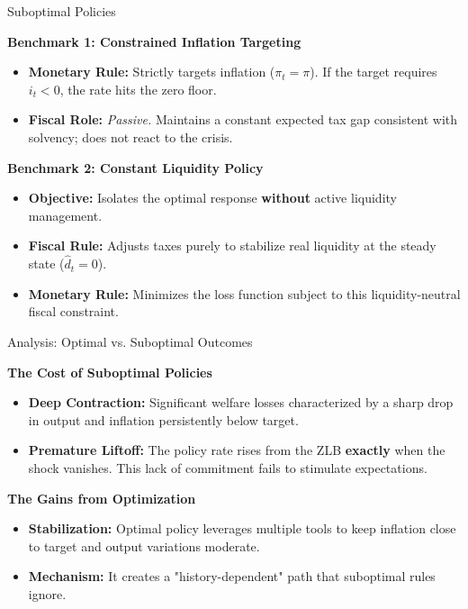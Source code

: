 \documentclass[11pt,aspectratio=169]{beamer}
\begin{document}
\begin{frame}{Suboptimal Policies}
\small

\textbf{Benchmark 1: Constrained Inflation Targeting}
\begin{itemize}
    \item \textbf{Monetary Rule:} Strictly targets inflation ($\pi _{t}=\pi$). If the target requires $i_t < 0$, the rate hits the zero floor.
    \item \textbf{Fiscal Role:} \textit{Passive.} Maintains a constant expected tax gap consistent with solvency; does not react to the crisis.
\end{itemize}

\vspace{0.4cm}

\textbf{Benchmark 2: Constant Liquidity Policy}
\begin{itemize}
    \item \textbf{Objective:} Isolates the optimal response \textbf{without} active liquidity management.
    \item \textbf{Fiscal Rule:} Adjusts taxes purely to stabilize real liquidity at the steady state ($\hat{d}_t = 0$).
    \item \textbf{Monetary Rule:} Minimizes the loss function subject to this liquidity-neutral fiscal constraint.
\end{itemize}
\end{frame}

\begin{frame}{Analysis: Optimal vs. Suboptimal Outcomes}
\small

\textbf{The Cost of Suboptimal Policies}
\begin{itemize}
    \item \textbf{Deep Contraction:} Significant welfare losses characterized by a sharp drop in output and inflation persistently below target.
    \item \textbf{Premature Liftoff:} The policy rate rises from the ZLB \textbf{exactly} when the shock vanishes. This lack of commitment fails to stimulate expectations.
\end{itemize}

\vspace{0.4cm}

\textbf{The Gains from Optimization}
\begin{itemize}
    \item \textbf{Stabilization:} Optimal policy leverages multiple tools to keep inflation close to target and output variations moderate.
    \item \textbf{Mechanism:} It creates a "history-dependent" path that suboptimal rules ignore.
\end{itemize}

\end{frame}
\end{document}
